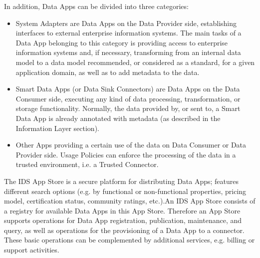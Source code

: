 In addition, Data Apps can be divided into three categories:

\begin{itemize}
	\item System Adapters are Data Apps on the Data Provider side, establishing interfaces to external enterprise information systems. The main tasks of a Data App belonging to this category is providing access to enterprise information systems and, if necessary, transforming from an internal data model to a data model recommended, or considered as a standard, for a given application domain, as well as to add metadata to the data.

	\item Smart Data Apps (or Data Sink Connectors) are Data Apps on the Data Consumer side, executing any kind of data processing, transformation, or storage functionality. Normally, the data provided by, or sent to, a Smart Data App is already annotated with metadata (as described in the Information Layer section).

	\item Other Apps providing a certain use of the data on Data Consumer or Data Provider side. Usage Policies can enforce the processing of the data in a trusted environment, i.e. a Trusted Connector. 
\end{itemize}



The IDS App Store is a secure platform for distributing Data Apps; features different search options (e.g. by functional or non-functional properties, pricing model, certification status, community ratings, etc.).An IDS App Store consists of a registry for available Data Apps in this App Store. Therefore an App Store supports operations for Data App registration, publication, maintenance, and query, as well as operations for the provisioning of a Data App to a connector. These basic operations can be complemented by additional services, e.g. billing or support activities. 


